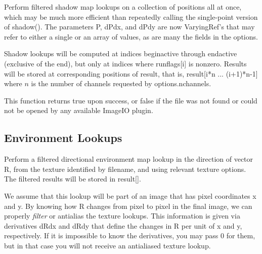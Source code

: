 Perform filtered shadow map lookups on a collection of positions all at
once, which may be much more efficient than repeatedly calling the
single-point version of {\cf shadow()}.  The parameters {\cf P},
{\cf dPdx}, and {\cf dPdy} are now
{\cf VaryingRef}'s that may refer to either a single or an array of
values, as are many the fields in the {\cf options}.

Shadow lookups will be computed at indices {\cf beginactive} through
{\cf endactive} (exclusive of the end), but only at indices where {\cf runflags[i]}
is nonzero.  Results will be stored at corresponding positions of
{\cf result}, that is, {\cf result[i*n ... (i+1)*n-1]} where $n$ 
is the number of channels requested by {\cf options.nchannels}.

This function returns {\cf true} upon success, or {\cf false} if the
file was not found or could not be opened by any available ImageIO
plugin.
\apiend

\subsection{Environment Lookups}
\label{sec:texturesys:api:environment}


Perform a filtered directional environment map lookup in the direction
of vector {\cf R}, from the texture identified by {\cf filename}, and
using relevant texture {\cf options}.  The filtered results will be
stored in {\cf result[]}.

We assume that this lookup will be part of an image that has pixel
coordinates {\cf x} and {\cf y}.  By knowing how {\cf R} changes from
pixel to pixel in the final image, we can properly \emph{filter} or
antialias the texture lookups.  This information is given via
derivatives {\cf dRdx} and {\cf dRdy} that define the changes in {\cf R}
per unit of {\cf x} and {\cf y}, respectively.  If it is impossible to
know the derivatives, you may pass 0 for them, but in that case you will
not receive an antialiased texture lookup.

